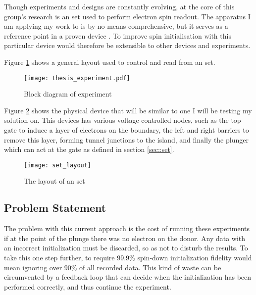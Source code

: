 
\label{sec::experiment}
Though experiments and designs are constantly evolving, at the core of this group's research is an \gls{set} used to perform electron spin readout. The apparatus I am applying my work to is by no means comprehensive, but it serves as a reference point in a proven device \cite{morello2010single}. To improve spin initialisation with this particular device would therefore be extensible to other devices and experiments.

Figure \ref{fig::thesis_experiment} shows a general layout used to control and read from an \gls{set}.

\begin{figure}[htbp!]
	\centering
	\texttt{[image: thesis\_experiment.pdf]}
	\caption{Block diagram of experiment}
	\label{fig::thesis_experiment}
\end{figure}


Figure \ref{fig::set_layout} shows the physical device that will be similar to one I will be testing my solution on. This devices has various voltage-controlled nodes, such as the top gate to induce a layer of electrons on the boundary, the left and right barriers to remove this layer, forming tunnel junctions to the island, and finally the plunger which can act at the gate as defined in section \ref{sec::set}.

\begin{figure}[htbp!]
	\centering
	\texttt{[image: set\_layout]}
	\caption[Layout of an \gls{set}]{The layout of an \gls{set}\cite{morello2010single}}
	\label{fig::set_layout}
\end{figure}

\subsection{Problem Statement}
The problem with this current approach is the cost of running these experiments if at the point of the plunge there was no electron on the donor. Any data with an incorrect initialization must be discarded, so as not to disturb the results. To take this one step further, to require 99.9\% spin-down initialization fidelity would mean ignoring over 90\% of all recorded data. This kind of waste can be circumvented by a feedback loop that can decide when the initialization has been performed correctly, and thus continue the experiment.

